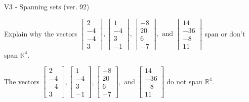 \begin{exercise}
  \begin{exerciseTitle}V3 - Spanning sets (ver. 92)\end{exerciseTitle}
  \begin{exerciseStatement}
    Explain why the vectors \(\left[\begin{array}{r}
2 \\
-4 \\
-4 \\
3
\end{array}\right] , \left[\begin{array}{r}
1 \\
-4 \\
3 \\
-1
\end{array}\right] , \left[\begin{array}{r}
-8 \\
20 \\
6 \\
-7
\end{array}\right] , \text{ and } \left[\begin{array}{r}
14 \\
-36 \\
-8 \\
11
\end{array}\right]\) span or don't span \(\mathbb{R}^4\). 
	


  \end{exerciseStatement}
  \begin{exerciseAnswer}
   The vectors \(\left[\begin{array}{r}
2 \\
-4 \\
-4 \\
3
\end{array}\right] , \left[\begin{array}{r}
1 \\
-4 \\
3 \\
-1
\end{array}\right] , \left[\begin{array}{r}
-8 \\
20 \\
6 \\
-7
\end{array}\right] , \text{ and } \left[\begin{array}{r}
14 \\
-36 \\
-8 \\
11
\end{array}\right]\) 
  	 do not  
	span \(\mathbb{R}^4\).
  


  \end{exerciseAnswer}
\end{exercise}